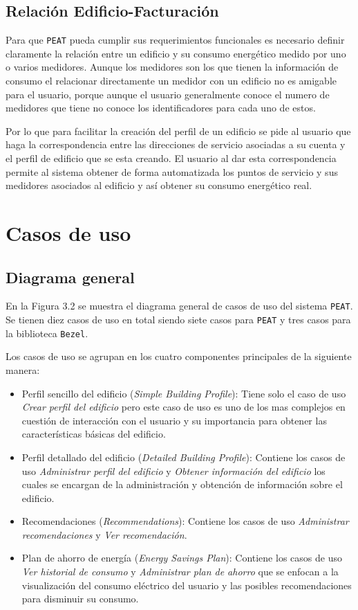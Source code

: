 \subsection{Relación Edificio-Facturación}

Para que \texttt{PEAT} pueda cumplir sus requerimientos funcionales es necesario
definir claramente la relación entre un edificio y su consumo energético medido
por uno o varios medidores.
Aunque los medidores son los que tienen la información de consumo el relacionar
directamente un medidor con un edificio no es amigable para el usuario, porque
aunque el usuario generalmente conoce el numero de medidores que tiene no conoce
los identificadores para cada uno de estos.

Por lo que para facilitar la creación del perfil de un edificio se pide al usuario
que haga la correspondencia entre las direcciones de servicio asociadas a su cuenta
y el perfil de edificio que se esta creando.
El usuario al dar esta correspondencia permite al sistema obtener de forma
automatizada los puntos de servicio y sus medidores asociados al edificio y así
obtener su consumo energético real.

\section{Casos de uso}

\subsection{Diagrama general}

En la Figura 3.2 se muestra el diagrama general de casos de uso del sistema
\texttt{PEAT}. Se tienen diez casos de uso en total siendo siete casos para
\texttt{PEAT} y tres casos para la biblioteca \texttt{Bezel}.

Los casos de uso se agrupan en los cuatro componentes principales de la
siguiente manera:

\begin{itemize}
\item Perfil sencillo del edificio (\textit{Simple Building Profile}): Tiene
  solo el caso de uso \textit{Crear perfil del edificio} pero este caso de uso
  es uno de los mas complejos en cuestión de interacción con el usuario y su
  importancia para obtener las características básicas del edificio.
\item Perfil detallado del edificio (\textit{Detailed Building Profile}): Contiene
  los casos de uso \textit{Administrar perfil del edificio} y
  \textit{Obtener información del edificio} los cuales se encargan de la
  administración y obtención de información sobre el edificio.
\item Recomendaciones (\textit{Recommendations}): Contiene los casos de uso
  \textit{Administrar recomendaciones} y \textit{Ver recomendación}.
\item Plan de ahorro de energía (\textit{Energy Savings Plan}): Contiene los
  casos de uso \textit{Ver historial de consumo} y \textit{Administrar plan de
    ahorro}
  que se enfocan a la visualización del consumo eléctrico del usuario y las
  posibles recomendaciones para disminuir su consumo.
\end{itemize}

